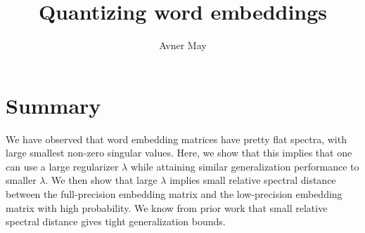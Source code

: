 \documentclass[12pt]{article}
\newcommand{\sm}{\sigma_{min}}
\begin{document}
\title{Quantizing word embeddings}
\author{Avner May}
\onehalfspacing
\maketitle

\section{Summary}
We have observed that word embedding matrices have pretty flat spectra, with large smallest non-zero singular values.  Here, we show that this implies that one can use a large regularizer $\lambda$ while attaining similar generalization performance to smaller $\lambda$.  We then show that large $\lambda$ implies small relative spectral distance between the full-precision embedding matrix and the low-precision embedding matrix with high probability.  We know from prior work that small relative spectral distance gives tight generalization bounds.

	
\end{document}
